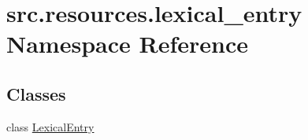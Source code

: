 \hypertarget{namespacesrc_1_1resources_1_1lexical__entry}{\section{src.\+resources.\+lexical\+\_\+entry Namespace Reference}
\label{namespacesrc_1_1resources_1_1lexical__entry}
}
\subsection*{Classes}
\begin{DoxyCompactItemize}
\item 
class \hyperlink{classsrc_1_1resources_1_1lexical__entry_1_1_lexical_entry}{Lexical\+Entry}
\end{DoxyCompactItemize}
